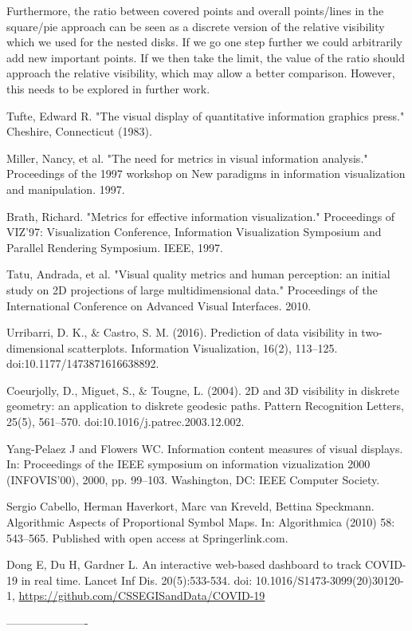 \documentclass[a4paper,11pt]{article}
\begin{document}
Furthermore, the ratio between covered points and overall points/lines in the square/pie approach can be seen as a discrete version of the relative visibility which we used for the nested disks. If we go one step further we could arbitrarily add new important points. If we then take the limit, the value of the ratio should approach the relative visibility, which may allow a better comparison. However, this needs to be explored in further work.

\begin{thebibliography}{999}

  Tufte, Edward R. "The visual display of quantitative information graphics press." Cheshire, Connecticut (1983).

  Miller, Nancy, et al. "The need for metrics in visual information analysis." Proceedings of the 1997 workshop on New paradigms in information visualization and manipulation. 1997.

  Brath, Richard. "Metrics for effective information visualization." Proceedings of VIZ'97: Visualization Conference, Information Visualization Symposium and Parallel Rendering Symposium. IEEE, 1997.

  Tatu, Andrada, et al. "Visual quality metrics and human perception: an initial study on 2D projections of large multidimensional data." Proceedings of the International Conference on Advanced Visual Interfaces. 2010.

  Urribarri, D. K., \& Castro, S. M. (2016). Prediction of data visibility in two-dimensional scatterplots. Information Visualization, 16(2), 113–125. doi:10.1177/1473871616638892.

  Coeurjolly, D., Miguet, S., \& Tougne, L. (2004). 2D and 3D visibility in diskrete geometry: an application to diskrete geodesic paths. Pattern Recognition Letters, 25(5), 561–570. doi:10.1016/j.patrec.2003.12.002.

  Yang-Pelaez J and Flowers WC. Information content
  measures of visual displays. In: Proceedings of the IEEE symposium on information vizualization 2000 (INFOVIS’00), 2000, pp. 99–103. Washington, DC: IEEE Computer Society.

  Sergio Cabello, Herman Haverkort, Marc van Kreveld, Bettina Speckmann. Algorithmic Aspects of Proportional Symbol Maps. In: Algorithmica (2010) 58: 543–565. Published with open access at Springerlink.com.%

   Dong E, Du H, Gardner L. An interactive web-based dashboard to track COVID-19 in real time. Lancet Inf Dis. 20(5):533-534. doi: 10.1016/S1473-3099(20)30120-1, \url{https://github.com/CSSEGISandData/COVID-19}



\end{thebibliography}

----------------------
\end{document}
